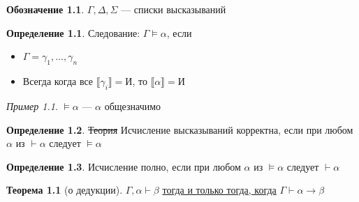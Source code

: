 \documentclass[oneside]{book}
\newcommand{\llb}{\llbracket}
\newcommand{\rrb}{\rrbracket}
\theoremstyle{plain}
\theoremstyle{remark}
\newtheorem*{examp}{Пример}
\theoremstyle{definition}
\newtheorem{theorem}{Теорема}[section]
\newtheorem*{definition}{Определение}
\newtheorem*{symb}{Обозначение}
\begin{document}
\chapter{}
\label{sec:orgabdcf11}
\begin{symb}
\(\Gamma, \Delta, \Sigma\) --- списки высказываний
\end{symb}
\begin{definition}
Следование: \(\Gamma \vDash \alpha\), если
\begin{itemize}
\item \(\Gamma = \gamma_1, \dots, \gamma_n\)
\item Всегда когда все \(\llb \gamma_i \rrb = \text{И}\), то \(\llb \alpha \rrb = \text{И}\)
\end{itemize}
\label{orge65448d}
\end{definition}
\begin{examp}
\(\vDash \alpha\) --- \(\alpha\) общезначимо
\label{org27689bf}
\end{examp}
\begin{definition}
\sout{Теория} Исчисление высказываний корректна, если при любом \(\alpha\) из \(\vdash \alpha\) следует \(\vDash \alpha\)
\label{orgc7a28a0}
\end{definition}
\begin{definition}
Исчисление полно, если при любом \(\alpha\) из \(\vDash \alpha\) следует \(\vdash \alpha\)
\label{orge44bace}
\end{definition}
\begin{theorem}[о дедукции]
\(\Gamma, \alpha \vdash \beta\) \uline{тогда и только тогда, когда} \(\Gamma \vdash \alpha \to \beta\)
\label{orgcc98543}
\end{theorem}
\end{document}
